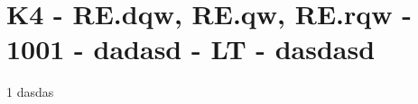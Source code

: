 \section{K4 - RE.dqw, RE.qw, RE.rqw - 1001 - dadasd - LT - dasdasd}

\begin{langesbeispiel}\item[1] %
dasdas

\end{langesbeispiel}